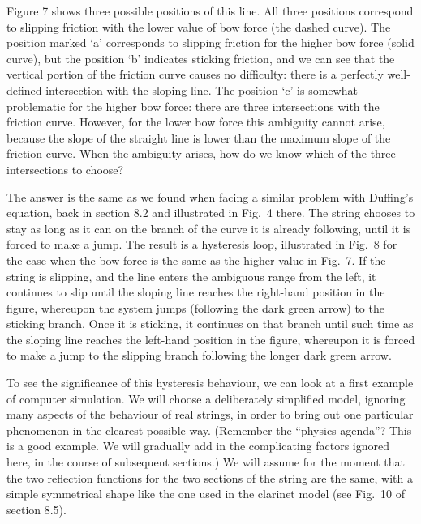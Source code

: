 
  Figure 7 shows three possible positions of this line. All three positions 
  correspond to slipping friction with the lower value of bow force (the dashed 
  curve). The position marked `a' corresponds to slipping friction for the 
  higher bow force (solid curve), but the position `b' indicates sticking 
  friction, and we can see that the vertical portion of the friction curve 
  causes no difficulty: there is a perfectly well-defined intersection with the 
  sloping line. The position `c' is somewhat problematic for the higher bow 
  force: there are three intersections with the friction curve. However, for 
  the lower bow force this ambiguity cannot arise, because the slope of the 
  straight line is lower than the maximum slope of the friction curve. When the 
  ambiguity arises, how do we know which of the three intersections to choose? 

  The answer is the same as we found when facing a similar problem with 
  Duffing's equation, back in section 8.2 and illustrated in Fig.\ 4 there. The 
  string chooses to stay as long as it can on the branch of the curve it is 
  already following, until it is forced to make a jump. The result is a 
  hysteresis loop, illustrated in Fig.\ 8 for the case when the bow force is 
  the same as the higher value in Fig.\ 7. If the string is slipping, and the 
  line enters the ambiguous range from the left, it continues to slip until the 
  sloping line reaches the right-hand position in the figure, whereupon the 
  system jumps (following the dark green arrow) to the sticking branch. Once it 
  is sticking, it continues on that branch until such time as the sloping line 
  reaches the left-hand position in the figure, whereupon it is forced to make 
  a jump to the slipping branch following the longer dark green arrow. 


  To see the significance of this hysteresis behaviour, we can look at a first 
  example of computer simulation. We will choose a deliberately simplified 
  model, ignoring many aspects of the behaviour of real strings, in order to 
  bring out one particular phenomenon in the clearest possible way. (Remember 
  the “physics agenda”? This is a good example. We will gradually add in the 
  complicating factors ignored here, in the course of subsequent sections.) We 
  will assume for the moment that the two reflection functions for the two 
  sections of the string are the same, with a simple symmetrical shape like the 
  one used in the clarinet model (see Fig.\ 10 of section 8.5). 

